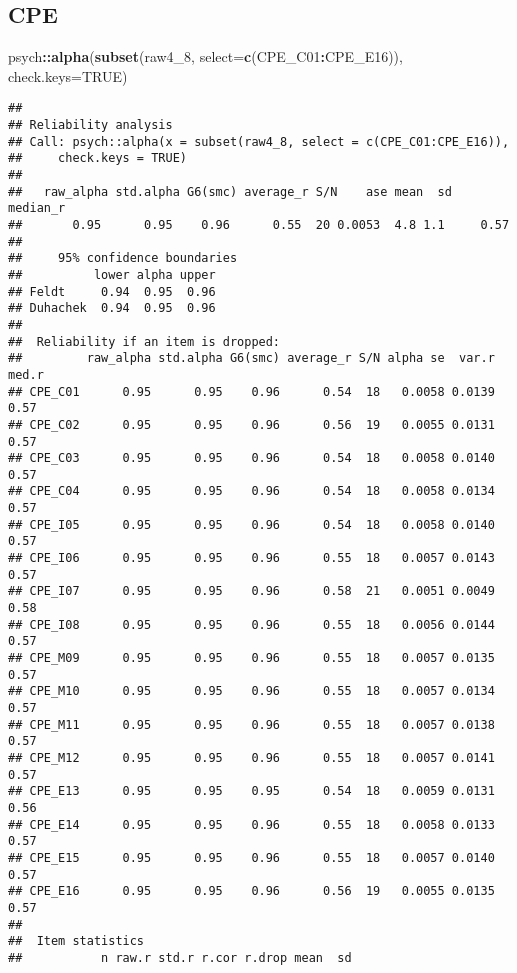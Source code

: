 \documentclass[
]{article}
\newenvironment{Shaded}{\begin{snugshade}}{\end{snugshade}}
\newcommand{\AttributeTok}[1]{\textcolor[rgb]{0.13,0.29,0.53}{#1}}
\newcommand{\ConstantTok}[1]{\textcolor[rgb]{0.56,0.35,0.01}{#1}}
\newcommand{\FunctionTok}[1]{\textcolor[rgb]{0.13,0.29,0.53}{\textbf{#1}}}
\newcommand{\NormalTok}[1]{#1}
\newcommand{\SpecialCharTok}[1]{\textcolor[rgb]{0.81,0.36,0.00}{\textbf{#1}}}
\begin{document}
\subsection{CPE}\label{cpe}

\begin{Shaded}
\begin{Highlighting}[]
\NormalTok{psych}\SpecialCharTok{::}\FunctionTok{alpha}\NormalTok{(}\FunctionTok{subset}\NormalTok{(raw4\_8, }\AttributeTok{select=}\FunctionTok{c}\NormalTok{(CPE\_C01}\SpecialCharTok{:}\NormalTok{CPE\_E16)), }\AttributeTok{check.keys=}\ConstantTok{TRUE}\NormalTok{)}
\end{Highlighting}
\end{Shaded}

\begin{verbatim}
## 
## Reliability analysis   
## Call: psych::alpha(x = subset(raw4_8, select = c(CPE_C01:CPE_E16)), 
##     check.keys = TRUE)
## 
##   raw_alpha std.alpha G6(smc) average_r S/N    ase mean  sd median_r
##       0.95      0.95    0.96      0.55  20 0.0053  4.8 1.1     0.57
## 
##     95% confidence boundaries 
##          lower alpha upper
## Feldt     0.94  0.95  0.96
## Duhachek  0.94  0.95  0.96
## 
##  Reliability if an item is dropped:
##         raw_alpha std.alpha G6(smc) average_r S/N alpha se  var.r med.r
## CPE_C01      0.95      0.95    0.96      0.54  18   0.0058 0.0139  0.57
## CPE_C02      0.95      0.95    0.96      0.56  19   0.0055 0.0131  0.57
## CPE_C03      0.95      0.95    0.96      0.54  18   0.0058 0.0140  0.57
## CPE_C04      0.95      0.95    0.96      0.54  18   0.0058 0.0134  0.57
## CPE_I05      0.95      0.95    0.96      0.54  18   0.0058 0.0140  0.57
## CPE_I06      0.95      0.95    0.96      0.55  18   0.0057 0.0143  0.57
## CPE_I07      0.95      0.95    0.96      0.58  21   0.0051 0.0049  0.58
## CPE_I08      0.95      0.95    0.96      0.55  18   0.0056 0.0144  0.57
## CPE_M09      0.95      0.95    0.96      0.55  18   0.0057 0.0135  0.57
## CPE_M10      0.95      0.95    0.96      0.55  18   0.0057 0.0134  0.57
## CPE_M11      0.95      0.95    0.96      0.55  18   0.0057 0.0138  0.57
## CPE_M12      0.95      0.95    0.96      0.55  18   0.0057 0.0141  0.57
## CPE_E13      0.95      0.95    0.95      0.54  18   0.0059 0.0131  0.56
## CPE_E14      0.95      0.95    0.96      0.55  18   0.0058 0.0133  0.57
## CPE_E15      0.95      0.95    0.96      0.55  18   0.0057 0.0140  0.57
## CPE_E16      0.95      0.95    0.96      0.56  19   0.0055 0.0135  0.57
## 
##  Item statistics 
##           n raw.r std.r r.cor r.drop mean  sd

\end{verbatim}
\end{document}
